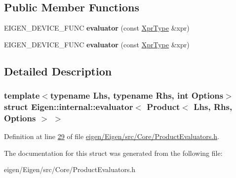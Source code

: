 \subsection*{Public Member Functions}
\begin{DoxyCompactItemize}
\item 
\mbox{\label{struct_eigen_1_1internal_1_1evaluator_3_01_product_3_01_lhs_00_01_rhs_00_01_options_01_4_01_4_a3658a46359bfb4b8335d8ecbdc4f1e85}} 
E\+I\+G\+E\+N\+\_\+\+D\+E\+V\+I\+C\+E\+\_\+\+F\+U\+NC {\bfseries evaluator} (const \hyperlink{group___core___module_class_eigen_1_1_product}{Xpr\+Type} \&xpr)
\item 
\mbox{\label{struct_eigen_1_1internal_1_1evaluator_3_01_product_3_01_lhs_00_01_rhs_00_01_options_01_4_01_4_a3658a46359bfb4b8335d8ecbdc4f1e85}} 
E\+I\+G\+E\+N\+\_\+\+D\+E\+V\+I\+C\+E\+\_\+\+F\+U\+NC {\bfseries evaluator} (const \hyperlink{group___core___module_class_eigen_1_1_product}{Xpr\+Type} \&xpr)
\end{DoxyCompactItemize}


\subsection{Detailed Description}
\subsubsection*{template$<$typename Lhs, typename Rhs, int Options$>$\newline
struct Eigen\+::internal\+::evaluator$<$ Product$<$ Lhs, Rhs, Options $>$ $>$}



Definition at line \hyperlink{eigen_2_eigen_2src_2_core_2_product_evaluators_8h_source_l00029}{29} of file \hyperlink{eigen_2_eigen_2src_2_core_2_product_evaluators_8h_source}{eigen/\+Eigen/src/\+Core/\+Product\+Evaluators.\+h}.



The documentation for this struct was generated from the following file\+:\begin{DoxyCompactItemize}
\item 
eigen/\+Eigen/src/\+Core/\+Product\+Evaluators.\+h\end{DoxyCompactItemize}
